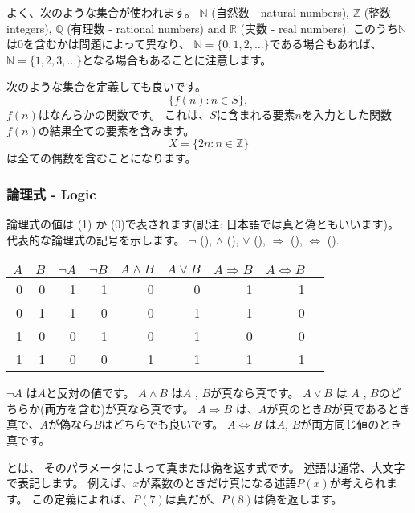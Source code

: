 よく、次のような集合が使われます。
$\mathbb{N}$ (自然数 - natural numbers),
$\mathbb{Z}$ (整数 - integers),
$\mathbb{Q}$ (有理数 - rational numbers) and
$\mathbb{R}$ (実数 - real numbers).
このうち$\mathbb{N}$は0を含むかは問題によって異なり、
$\mathbb{N}=\{0,1,2,\ldots\}$である場合もあれば、
$\mathbb{N}=\{1,2,3,...\}$となる場合もあることに注意します。

次のような集合を定義しても良いです。
\[\{f(n) : n \in S\},\]
$f(n)$はなんらかの関数です。
これは、$S$に含まれる要素$n$を入力とした関数$f(n)$の結果全ての要素を含みます。
\[X=\{2n : n \in \mathbb{Z}\}\]
は全ての偶数を含むことになります。


\subsubsection{論理式 - Logic}


論理式の値は
 (1) か  (0)で表されます(訳注: 日本語では真と偽ともいいます)。
代表的な論理式の記号を示します。
$\lnot$ (),
$\land$ (),
$\lor$ (),
$\Rightarrow$ (),
$\Leftrightarrow$ ().

\begin{center}
\begin{tabular}{rr|rrrrrrr}
$A$ & $B$ & $\lnot A$ & $\lnot B$ & $A \land B$ & $A \lor B$ & $A \Rightarrow B$ & $A \Leftrightarrow B$ \\
\hline
0 & 0 & 1 & 1 & 0 & 0 & 1 & 1 \\
0 & 1 & 1 & 0 & 0 & 1 & 1 & 0 \\
1 & 0 & 0 & 1 & 0 & 1 & 0 & 0 \\
1 & 1 & 0 & 0 & 1 & 1 & 1 & 1 \\
\end{tabular}
\end{center}

$\lnot A$ は$A$と反対の値です。
$A \land B$ は$A$ ,  $B$が真なら真です。
$A \lor B$ は $A$ ,  $B$のどちらか(両方を含む)が真なら真です。
$A \Rightarrow B$ は、$A$が真のとき$B$が真であるとき真で、$A$が偽なら$B$はどちらでも良いです。
$A \Leftrightarrow B$ は$A$, $B$が両方同じ値のとき真です。


とは、
そのパラメータによって真または偽を返す式です。
述語は通常、大文字で表記します。
例えば、$x$が素数のときだけ真になる述語$P(x)$が考えられます。
この定義によれば、$P(7)$は真だが、$P(8)$は偽を返します。

